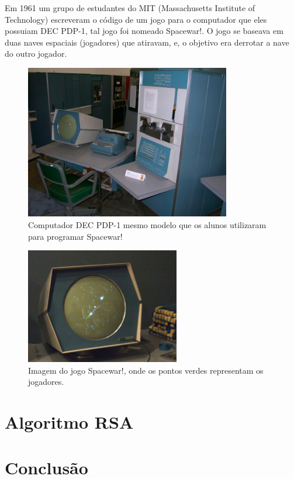 \documentclass[12pt]{article}
\begin{document}
 Em 1961 um grupo de estudantes do MIT (Massachusetts Institute of Technology) escreveram o código de um jogo para o computador que eles possuiam DEC PDP-1, tal jogo foi nomeado Spacewar!. O jogo se baseava em duas naves espaciais (jogadores) que atiravam, e, o objetivo era derrotar a nave do outro jogador. 
\linebreak
\begin{figure}[!htb]
    \centering
    \includegraphics[width=0.8\textwidth]{pc-velho.jpg}
    \caption{Computador DEC PDP-1 mesmo modelo que os alunos utilizaram para programar Spacewar!}
    \label{fig:pc-velho}
\end{figure}
\linebreak
\begin{figure}[!htb]
    \centering
    \includegraphics[width=0.6\textwidth]{spacewar.jpg}
    \caption{Imagem do jogo Spacewar!, onde os pontos verdes representam os jogadores.}
    \label{fig:spacewar}
\end{figure}
\linebreak
\pagebreak





 
\section{Algoritmo RSA}


\section{Conclus\~{a}o}





\nocite{pc-velho}
\end{document}
